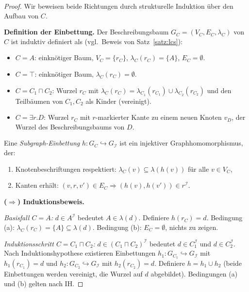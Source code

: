 ﻿\documentclass[a4paper,12pt]{article}
\theoremstyle{definition}
\theoremstyle{plain}
\theoremstyle{remark}
\newcommand{\interp}[1]{\ensuremath{\mathcal{#1}}}
\begin{document}
\begin{proof}
Wir beweisen beide Richtungen durch strukturelle Induktion
{\"u}ber den Aufbau von $C$.

\textbf{Definition der Einbettung.}
Der Beschreibungsbaum $G_C = (V_C, E_C, \lambda_C)$ von $C$
ist induktiv definiert als (vgl.\ Beweis von Satz~\ref{satz:lcs}):
\begin{itemize}
  \item $C = A$: einknötiger Baum, $V_C = \{r_C\}$,
        $\lambda_C(r_C) = \{A\}$, $E_C = \emptyset$.
  \item $C = \top$: einknötiger Baum, $\lambda_C(r_C) = \emptyset$.
  \item $C = C_1 \sqcap C_2$: Wurzel $r_C$ mit
        $\lambda_C(r_C) = \lambda_{C_1}(r_{C_1}) \cup \lambda_{C_2}(r_{C_2})$
        und den Teilb{\"a}umen von $C_1, C_2$ als Kinder (vereinigt).
  \item $C = \exists r.D$: Wurzel $r_C$ mit $r$-markierter
        Kante zu einem neuen Knoten $v_D$, der Wurzel des
        Beschreibungsbaums von $D$.
\end{itemize}

Eine \emph{Subgraph-Einbettung} $h: G_C \hookrightarrow G_\interp{I}$
ist ein injektiver Graphhomomorphismus, der:
\begin{enumerate}[label=(\alph*)]
  \item Knotenbeschriftungen respektiert:
        $\lambda_C(v) \subseteq \lambda(h(v))$ f{\"u}r alle $v \in V_C$,
  \item Kanten erhält:
        $(v, r, v') \in E_C \Rightarrow (h(v), h(v')) \in r^\interp{I}$.
\end{enumerate}

\textbf{($\Rightarrow$) Induktionsbeweis.}

\emph{Basisfall $C = A$:}
$d \in A^\interp{I}$ bedeutet $A \in \lambda(d)$.
Definiere $h(r_C) = d$.
Bedingung (a): $\lambda_C(r_C) = \{A\} \subseteq \lambda(d)$. \checkmark
Bedingung (b): $E_C = \emptyset$, nichts zu zeigen. \checkmark

\emph{Induktionsschritt $C = C_1 \sqcap C_2$:}
$d \in (C_1 \sqcap C_2)^\interp{I}$ bedeutet $d \in C_1^\interp{I}$
und $d \in C_2^\interp{I}$.
Nach Induktionshypothese existieren Einbettungen
$h_1: G_{C_1} \hookrightarrow G_\interp{I}$ mit $h_1(r_{C_1}) = d$
und $h_2: G_{C_2} \hookrightarrow G_\interp{I}$ mit $h_2(r_{C_2}) = d$.
Definiere $h = h_1 \cup h_2$ (beide Einbettungen werden vereinigt,
die Wurzel auf $d$ abgebildet). Bedingungen (a) und (b) gelten nach IH. \checkmark


\end{proof}
\end{document}
